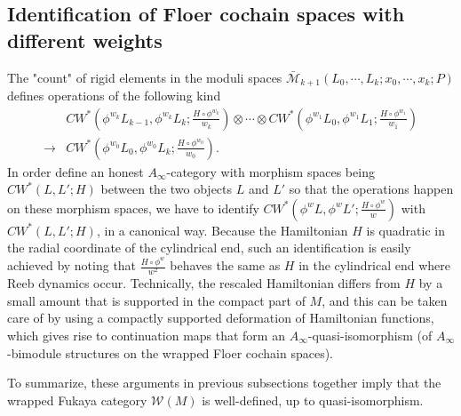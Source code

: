 \documentclass{amsart}
\numberwithin{equation}{section}
\numberwithin{figure}{section}
\begin{document}
\subsection{Identification of Floer cochain spaces with different weights}
	The "count" of rigid elements in the moduli spaces $\bar{\mathcal{M}}_{k+1}(L_{0}, \cdots, L_{k}; x_{0}, \cdots, x_{k}; P)$ defines operations of the following kind
\begin{equation}
\begin{split}
&CW^{*}(\phi^{w_{k}}L_{k-1}, \phi^{w_{k}}L_{k}; \frac{H \circ \phi^{w_{k}}}{w_{k}}) \otimes \cdots \otimes CW^{*}(\phi^{w_{1}}L_{0}, \phi^{w_{1}}L_{1}; \frac{H \circ \phi^{w_{1}}}{w_{1}})\\
\to &CW^{*}(\phi^{w_{0}}L_{0}, \phi^{w_{0}}L_{k}; \frac{H \circ \phi^{w_{0}}}{w_{0}}).
\end{split}
\end{equation}
	In order define an honest $A_{\infty}$-category with morphism spaces being $CW^{*}(L, L'; H)$ between the two objects $L$ and $L'$ so that the operations happen on these morphism spaces, we have to identify $CW^{*}(\phi^{w}L, \phi^{w}L'; \frac{H \circ \phi^{w}}{w})$ with $CW^{*}(L, L'; H)$, in a canonical way. Because the Hamiltonian $H$ is quadratic in the radial coordinate of the cylindrical end, such an identification is easily achieved by noting that $\frac{H \circ \phi^{w}}{w^{2}}$ behaves the same as $H$ in the cylindrical end where Reeb dynamics occur. Technically, the rescaled Hamiltonian differs from $H$ by a small amount that is supported in the compact part of $M$, and this can be taken care of by using a compactly supported deformation of Hamiltonian functions, which gives rise to continuation maps that form an $A_{\infty}$-quasi-isomorphism (of $A_{\infty}$-bimodule structures on the wrapped Floer cochain spaces). \par
	To summarize, these arguments in previous subsections together imply that the wrapped Fukaya category $\mathcal{W}(M)$ is well-defined, up to quasi-isomorphism. \par
\end{document}
